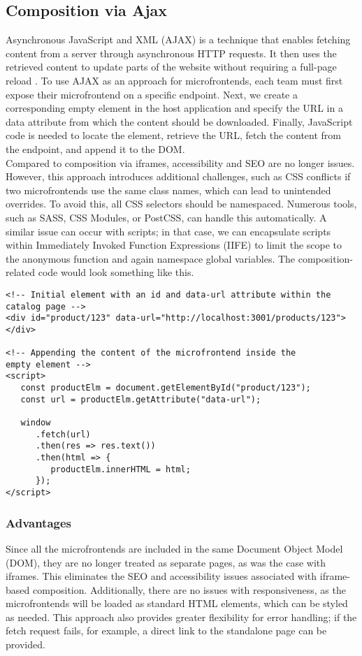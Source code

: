 \subsection{Composition via Ajax}
Asynchronous JavaScript and XML (AJAX) is a technique that enables fetching content from a server through asynchronous HTTP requests. It then uses the retrieved content to update parts of the website without requiring a full-page reload \cite{AjaxDocs}. To use AJAX as an approach for microfrontends, each team must first expose their microfrontend on a specific endpoint. Next, we create a corresponding empty element in the host application and specify the URL in a data attribute from which the content should be downloaded. Finally, JavaScript code is needed to locate the element, retrieve the URL, fetch the content from the endpoint, and append it to the DOM.\\

\noindent
Compared to composition via iframes, accessibility and SEO are no longer issues. However, this approach introduces additional challenges, such as CSS conflicts if two microfrontends use the same class names, which can lead to unintended overrides. To avoid this, all CSS selectors should be namespaced. Numerous tools, such as SASS, CSS Modules, or PostCSS, can handle this automatically. A similar issue can occur with scripts; in that case, we can encapsulate scripts within Immediately Invoked Function Expressions (IIFE) to limit the scope to the anonymous function and again namespace global variables. \cite{MicrofrontendsInAction} The composition-related code would look something like this.
\begin{verbatim}
<!-- Initial element with an id and data-url attribute within the
catalog page -->
<div id="product/123" data-url="http://localhost:3001/products/123">
</div>
               
<!-- Appending the content of the microfrontend inside the 
empty element -->
<script>
   const productElm = document.getElementById("product/123");
   const url = productElm.getAttribute("data-url");

   window
      .fetch(url)
      .then(res => res.text())
      .then(html => {
         productElm.innerHTML = html;
      });
</script>
\end{verbatim}

\subsubsection{Advantages}
Since all the microfrontends are included in the same Document Object Model (DOM), they are no longer treated as separate pages, as was the case with iframes. This eliminates the SEO and accessibility issues associated with iframe-based composition. Additionally, there are no issues with responsiveness, as the microfrontends will be loaded as standard HTML elements, which can be styled as needed. This approach also provides greater flexibility for error handling; if the fetch request fails, for example, a direct link to the standalone page can be provided. \cite{MicrofrontendsInAction}

